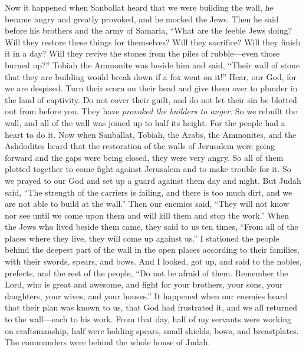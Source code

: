 \begin{biblechapter} %
  Now it happened when Sanballat heard that we were building the wall, he became angry and greatly provoked, and he mocked the Jews.
\verse Then he said before his brothers and the army of Samaria, “What are the feeble Jews doing? Will they restore these things for themselves? Will they sacrifice? Will they finish it in a day? Will they revive the stones from the piles of rubble—even those burned up?”
\verse Tobiah the Ammonite was beside him and said, “Their wall of stone that they are building would break down if a fox went on it!”
\verse Hear, our God, for we are despised. Turn their scorn on their head and give them over to plunder in the land of captivity.
\verse Do not cover their guilt, and do not let their sin be blotted out from before you. They have \textit{provoked the builders to anger}.
\verse So we rebuilt the wall, and all of the wall was joined up to half its height. For the people had a heart to do it.
 Now when Sanballat, Tobiah, the Arabs, the Ammonites, and the Ashdodites heard that the restoration of the walls of Jerusalem were going forward and the gaps were being closed, they were very angry.
\verse So all of them plotted together to come fight against Jerusalem and to make trouble for it.
\verse So we prayed to our God and set up a guard against them day and night.
\verse But Judah said, “The strength of the carriers is failing, and there is too much dirt, and we are not able to build at the wall.”
\verse Then our enemies said, “They will not know nor see until we come upon them and will kill them and stop the work.”
\verse When the Jews who lived beside them came, they said to us ten times, “From all of the places where they live, they will come up against us.”
\verse I stationed the people behind the deepest part of the wall in the open places according to their families, with their swords, spears, and bows.
\verse And I looked, got up, and said to the nobles, prefects, and the rest of the people, “Do not be afraid of them. Remember the Lord, who is great and awesome, and fight for your brothers, your sons, your daughters, your wives, and your houses.”
\verse It happened when our enemies heard that their plan was known to us, that God had frustrated it, and we all returned to the wall—each to his work.
\verse From that day, half of my servants were working on craftsmanship, half were holding spears, small shields, bows, and breastplates. The commanders were behind the whole house of Judah.

\end{biblechapter}
